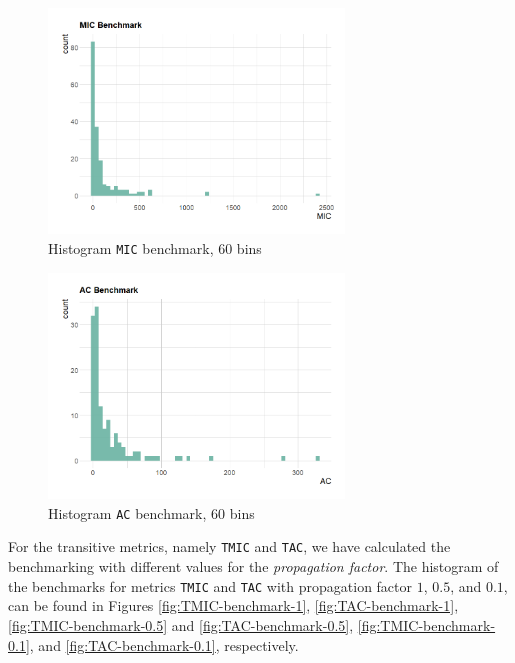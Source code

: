 \begin{figure}[ht!]
\begin{center}
  \includegraphics[width=0.7\textwidth]{figures/benchmark/MIC_benchmark.png}
  \caption{Histogram \texttt{MIC} benchmark, 60 bins}
  \label{fig:MIC-benchmark}
\end{center}
\end{figure}

\begin{figure}[ht!]
\begin{center}
\includegraphics[width=0.7\textwidth]{figures/benchmark/AC_benchmark.png}
\caption{Histogram \texttt{AC} benchmark, 60 bins}
\label{fig:AC-benchmark}
\end{center}
\end{figure}

For the transitive metrics, namely \texttt{TMIC} and \texttt{TAC}, we have calculated the benchmarking with different values for the \textit{propagation factor}. The histogram of the benchmarks for metrics \texttt{TMIC} and \texttt{TAC} with propagation factor $1$, $0.5$, and $0.1$, can be found in Figures \ref{fig:TMIC-benchmark-1}, \ref{fig:TAC-benchmark-1}, \ref{fig:TMIC-benchmark-0.5} and \ref{fig:TAC-benchmark-0.5}, \ref{fig:TMIC-benchmark-0.1}, and \ref{fig:TAC-benchmark-0.1}, respectively.

